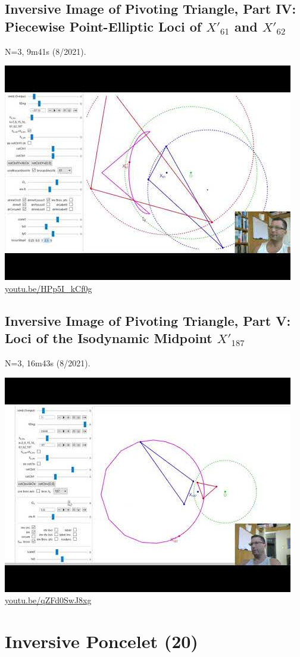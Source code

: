 \documentclass[12pt]{amsart}
\begin{document}
\subsection{Inversive Image of Pivoting Triangle, Part IV: Piecewise Point-Elliptic Loci of $X'_{61}$ and $X'_{62}$}
\label{vid:HPp5I_kCf0g}
\noindent N=3, 9m41s (8/2021). 
\begin{center}\includegraphics[width=.5\textwidth]{pics/HPp5I_kCf0g.jpg} \\ 
\href{https://youtu.be/HPp5I_kCf0g}{\url{youtu.be/HPp5I\_kCf0g}}\end{center}
% 

\subsection{Inversive Image of Pivoting Triangle, Part V: Loci of the Isodynamic Midpoint $X'_{187}$}
\label{vid:qZFd0SwJ8xg}
\noindent N=3, 16m43s (8/2021). 
\begin{center}\includegraphics[width=.5\textwidth]{pics/qZFd0SwJ8xg.jpg} \\ 
\href{https://youtu.be/qZFd0SwJ8xg}{\url{youtu.be/qZFd0SwJ8xg}}\end{center}
% 


\section{Inversive Poncelet (20)}
\end{document}
